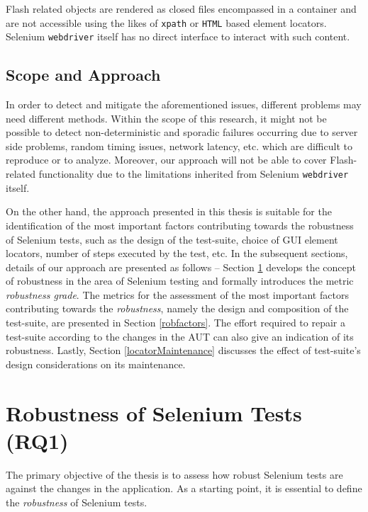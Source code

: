 Flash related objects are rendered as closed files encompassed in a container and are not accessible using the likes of \texttt{xpath} or \texttt{HTML} based element locators. Selenium \texttt{webdriver} itself has no direct interface to interact with such content. 

\subsection{Scope and Approach}

In order to detect and mitigate the aforementioned issues, different problems may need different methods. Within the scope of this research, it might not be possible to detect non-deterministic and sporadic failures occurring due to server side problems, random timing issues, network latency, etc. which are difficult to reproduce or to analyze. Moreover, our approach will not be able to cover Flash-related functionality due to the limitations inherited from Selenium \texttt{webdriver} itself.

On the other hand, the approach presented in this thesis is suitable for the identification of the most important factors contributing towards the robustness of Selenium tests, such as the design of the test-suite, choice of GUI element locators, number of steps executed by the test, etc. In the subsequent sections, details of our approach are presented as follows -- Section \ref{robustnessOfSeleniumTests} develops the concept of robustness in the area of Selenium testing and formally introduces the metric \textit{robustness grade}. The metrics for the assessment of the most important factors contributing towards the \textit{robustness}, namely the design and composition of the test-suite, are presented in Section \ref{robfactors}. The effort required to repair a test-suite according to the changes in the AUT can also give an indication of its robustness. Lastly, Section \ref{locatorMaintenance} discusses the effect of test-suite's design considerations on its maintenance. 

\section{Robustness of Selenium Tests (RQ1)}
\label{robustnessOfSeleniumTests}

The primary objective of the thesis is to assess how robust Selenium tests are against the changes in the application. As a starting point, it is essential to define the \textit{robustness} of Selenium tests. 

